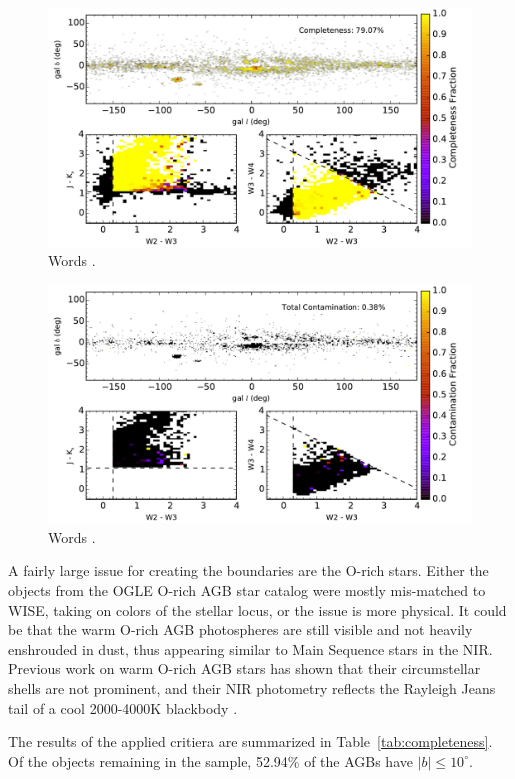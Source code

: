 \begin{figure}[h]
\includegraphics[width=6.7in]{figs/completeness_map.pdf}
\caption{Words \label{fig:completeness}.}
\end{figure}
\begin{figure}[h]
\includegraphics[width=6.7in]{figs/contamination_map.pdf}
\caption{Words \label{fig:contamination}.}
\end{figure}

A fairly large issue for creating the boundaries are the O-rich stars.  Either the objects from the OGLE O-rich AGB star catalog were mostly mis-matched to WISE, taking on colors of the stellar locus, or the issue is more physical.  It could be that the warm O-rich AGB photospheres are still visible and not heavily enshrouded in dust, thus appearing similar to Main Sequence stars in the NIR. Previous work on warm O-rich AGB stars has shown that their circumstellar shells are not prominent, and their NIR photometry reflects the Rayleigh Jeans tail of a cool 2000-4000K blackbody \citep{1974ApJ...189...89D}. 

The results of the applied critiera are summarized in Table~\ref{tab:completeness}. Of the objects remaining in the sample, 52.94\% of the AGBs have $\lvert b\rvert \le 10^\circ$.

